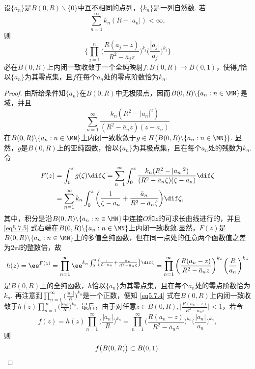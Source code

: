 \begin{theorem}\label{thm5.7.4}
设$\{a_n\}$是$B(0,R)\backslash\{0\}$中互不相同的点列，$\{k_n\}$是一列自然数. 若
\[\sum_{n=1}^\infty k_n(R-|a_n|)<\infty,\]
则
\begin{equation}\label{eq5.7.4}
\bigg\{\prod_{j=1}^n\bigg(\frac{R(a_j-z)}{R^2-\bar a_jz}\bigg)^{k_j}
\bigg(\frac{|a_j|}{a_j}\bigg)^{k_j}\bigg\}
\end{equation}
必在$B(0,R)$上内闭一致收敛于一个全纯映射$f:B(0,R)\to B(0,1)$，使得$f$恰以$\{a_n\}$为其零点集，且$f$在每个$a_n$处的零点阶数恰为$k_n$.
\end{theorem}
\begin{proof}
由所给条件知$\{a_n\}$在$B(0,R)$中无极限点，因而$B(0,R)\backslash\{a_n:n\in\MN\}$是域，并且
\[\sum_{n=1}^\infty\frac{k_n(R^2-|a_n|^2)}{(R^2-\bar a_nz)(z-a_n)}\]
在$B(0,R)\backslash\{a_n:n\in\MN\}$上内闭一致收敛于$g\in H\big(B(0,R)\backslash
\{a_n:n\in\MN\}\big)$. 显然，$g$是$B(0,R)$上的亚纯函数，恰以$\{a_n\}$为其极点集，且在每个$a_n$处的残数为$k_n$. 令
\begin{equation}\label{eq5.7.5}
\begin{aligned}
F(z)&=\int_0^zg(\zeta)\dif \zeta=\sum_{n=1}^\infty\int_0^z
\frac{k_n(R^2-|a_n|^2)}{(R^2-\bar a_n\zeta)(\zeta-a_n)}\dif \zeta\\
&=\sum_{n=1}^\infty k_n\int_0^z\bigg(\frac1{\zeta-a_n}+\frac{\bar a_n}{R^2
-\bar a_n\zeta}\bigg)\dif \zeta,
\end{aligned}
\end{equation}
其中，积分是沿$B(0,R)\backslash\{a_n:n\in\MN\}$中连接$O$和$z$的可求长曲线进行的，并且 \eqref{eq5.7.5} 式右端在$B(0,R)\backslash\{a_n:n\in\MN\}$上内闭一致收敛.显然，$F(z)$是$B(0,R)\backslash\{a_n:n\in\MN\}$上的多值全纯函数，但在同一点处的任意两个函数值之差为$2\pi\ii$的整数倍，故
\[h(z)=\ee^{F(z)}=\prod_{n=1}^\infty\ee^{k_n\int_0^z\left(\frac1{\zeta-a_n}
+\frac{a_n}{R^2-\bar a_n\zeta}\right)\dif \zeta}
=\prod_{n=1}^\infty\bigg(\frac{R(a_n-z)}{R^2-\bar a_nz}\bigg)^{k_n}
\bigg(\frac{R}{a_n}\bigg)^{k_n}\]
是$B(0,R)$上的全纯函数，$h$恰以$\{a_n\}$为其零点集，且在每个$a_n$处的零点阶数恰为$k_n$. 再注意到$\prod_{n=1}^\infty\bigg(\frac{|a_n|}{R}\bigg)^{k_n}$是一个正数，便知 \eqref{eq5.7.4} 式在$B(0,R)$上内闭一致收敛于$h(z)\prod_{n=1}^\infty\bigg(\frac{|a_n|}{R}\bigg)^{k_n}$. 最后，由于对任意$z\in B(0,R),\bigg|\frac{R(a_n-z)}{R^2-\bar a_nz}\bigg|<1$，若令
\[f(z)=h(z)\prod_{n=1}^\infty\bigg(\frac{|a_n|}{R}\bigg)^{k_n}
=\prod_{n=1}^\infty\bigg(\frac{R(a_n-z)}{R^2-\bar a_nz}\bigg)^{k_n}
\bigg(\frac{|a_n|}{a_n}\bigg)^{k_n},\]
则
\begin{equation*}
  f\big(B(0,R)\big)\subset B(0,1). \qedhere
\end{equation*}
\end{proof}

